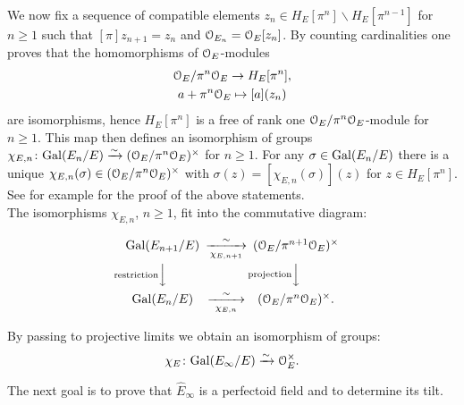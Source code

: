 We now fix a sequence of compatible elements 
$z_n\in H_E[\pi^n]\backslash H_E[\pi^{n-1}]$ for $n\geq1$ such that $[\pi]z_{n+1}=z_n$ and $\mathcal{O}_{E_n}=\mathcal{O}_E[z_n]$.
By counting cardinalities one proves that the homomorphisms of $\mathcal{O}_E$-modules
\begin{gather*}
\mathcal{O}_E/\pi^n\mathcal{O}_E\to H_E[\pi^n],\\
a+\pi^n\mathcal{O}_E\mapsto [a](z_n)
\end{gather*}
are isomorphisms, hence $H_E[\pi^n]$ is a free of rank one $\mathcal{O}_E/\pi^n\mathcal{O}_E$-module for $n\geq1$.
This map then defines an isomorphism of groups $\chi_{E,n}\colon{\rm{Gal}}(E_n/E)\xrightarrow{\sim}(\mathcal{O}_E/\pi^n\mathcal{O}_E)^{\times}$ for $n\geq1$.
For any $\sigma\in{\rm{Gal}}(E_n/E)$ there is a unique $\chi_{E,n}(\sigma)\in(\mathcal{O}_E/\pi^n\mathcal{O}_E)^{\times}$ with $\sigma(z) = [\chi_{E,n}(\sigma)](z)$ for $z\in H_E[\pi^n]$.
See for example \cite[chapter 32.1]{Hazewinkel78} for the proof of the above statements.\\

The isomorphisms $\chi_{E,n}$, $n\geq1$, fit into the commutative diagram:

$$\begin{CD}
	\Gal(E_{n+1}/E)     @>\sim>\chi_{E,n+1}>  (\Oo_E/\pi^{n+1}\Oo_E)^{\times}\\
	@V\text{restriction}VV        @V\text{projection}VV\\
	\Gal(E_n/E)     @>\sim>\chi_{E,n}>  (\Oo_E/\pi^n\Oo_E)^{\times}.
\end{CD}$$


By passing to projective limits we obtain an isomorphism of groups: 
\[\chi_{E}\colon{\rm{Gal}}(E_{\infty}/E)\xrightarrow{\sim}\mathcal{O}_E^{\times}.\]

The next goal is to prove that $\hat{E}_{\infty}$ is a perfectoid field and to determine its tilt.

